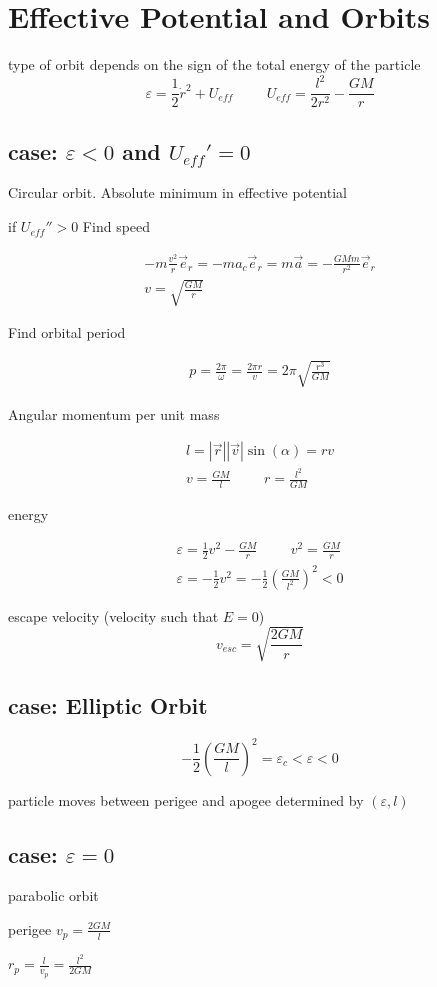 \documentclass[fleqn]{report}
\newcommand{\hp}{\hspace{1cm}}
\newcommand{\equations} [1] {
\begin{gather*}
#1
\end{gather*}
}
\begin{document}
\section{Effective Potential and Orbits}
type of orbit depends on the sign of the total energy of the particle 
\[
\varepsilon = \frac{1}{2} \dot r^2 + U_{eff} 
\hp 
U_{eff} = \frac{l^2}{2r^2} - \frac{GM}{r}
\]

\subsection{case: $\varepsilon < 0$ and $U_{eff}' = 0$}
Circular orbit. Absolute minimum in effective potential 

if $U_{eff}'' > 0$
Find speed 

\equations{
    -m \frac{v^2}{r} \vec e_r = -ma_c \vec e_r = m \vec a = - \frac{GMm}{r^2} \vec e_r
    \\
    v = \sqrt{\frac{GM}{r}}
}

Find orbital period 
\equations{
    p = \frac{2 \pi}{\omega} = \frac{2 \pi r}{v} = 
    2 \pi \sqrt{\frac{r^3}{GM}}
}

Angular momentum per unit mass 
\equations{
    l = |\vec r||\vec v| \sin(\alpha) = rv 
    \\
    v = \frac{GM}{l} \hp r = \frac{l^2}{GM}
}

energy 
\equations{
    \varepsilon = \frac{1}{2} v^2 - \frac{GM}{r} \hp v^2 = \frac{GM}{r}
    \\
    \varepsilon = - \frac{1}{2} v^2 = - \frac{1}{2} \left( \frac{GM}{l^2} \right)^2
    < 0
}

escape velocity (velocity such that $E = 0$)
\[
v_{esc} = \sqrt{\frac{2GM}{r}}
\]

\subsection{case: Elliptic Orbit}
\[
- \frac{1}{2} \left(\frac{GM}{l}\right)^2 = \varepsilon_c < \varepsilon < 0
\]

particle moves between perigee and apogee determined by $(\varepsilon, l)$

\subsection{case: $\varepsilon = 0$}
parabolic orbit 

perigee $v_p = \frac{2GM}{l}$

$r_p = \frac{l}{v_p} = \frac{l^2}{2GM}$
\end{document}
